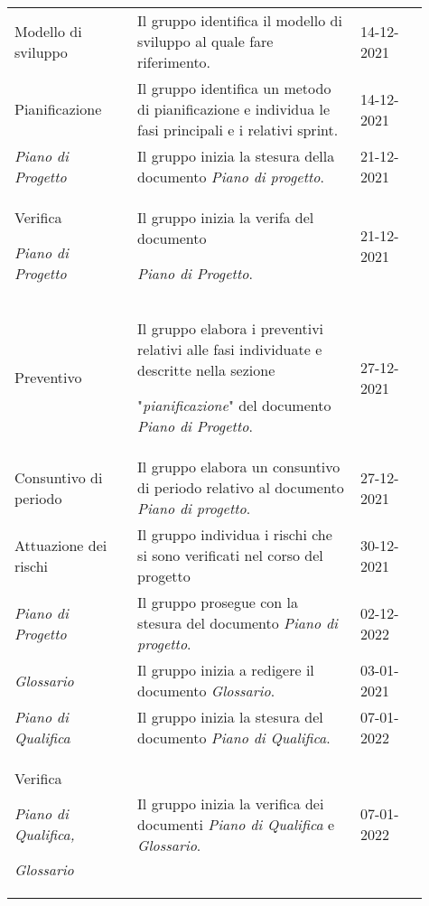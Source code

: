 {\begin{longtable}{p{0.27\linewidth}p{0.49\linewidth}p{0.15\linewidth}}
    \rowcolor[RGB]{216, 235, 171}
    Modello di sviluppo & Il gruppo identifica il modello di sviluppo al quale fare riferimento. & 14-12-2021\\

    \rowcolor[RGB]{233, 245, 206}
    Pianificazione & Il gruppo identifica un metodo di pianificazione e individua le fasi principali e i relativi sprint. & 14-12-2021\\

    \rowcolor[RGB]{216, 235, 171}
    \textit{Piano di Progetto} & Il gruppo inizia la stesura della documento \textit{Piano di progetto}. & 21-12-2021\\

    \rowcolor[RGB]{233, 245, 206}
    Verifica \par \textit{Piano di Progetto} & Il gruppo inizia la verifa del documento \par \textit{Piano di Progetto}. & 21-12-2021\\

    \rowcolor[RGB]{216, 235, 171}
    Preventivo & Il gruppo elabora i preventivi relativi alle fasi individuate e descritte nella sezione \par "\textit{pianificazione}" del documento \textit{Piano di Progetto}. & 27-12-2021\\

    \rowcolor[RGB]{233, 245, 206}
    Consuntivo di periodo & Il gruppo elabora un consuntivo di periodo relativo al documento \textit{Piano di progetto}. & 27-12-2021\\

    \rowcolor[RGB]{216, 235, 171}
    Attuazione dei rischi & Il gruppo individua i rischi che si sono verificati nel corso del progetto & 30-12-2021\\

    \rowcolor[RGB]{233, 245, 206}
    \textit{Piano di Progetto} & Il gruppo prosegue con la stesura del documento \textit{Piano di progetto}. & 02-12-2022\\
    
    \rowcolor[RGB]{216, 235, 171}
    \textit{Glossario} & Il gruppo inizia a redigere il documento \textit{Glossario}. & 03-01-2021\\

    \rowcolor[RGB]{233, 245, 206}
    \textit{Piano di Qualifica} & Il gruppo inizia la stesura del documento \textit{Piano di Qualifica}. & 07-01-2022\\

    \rowcolor[RGB]{216, 235, 171}
    Verifica \par \textit{Piano di Qualifica,} \par \textit{Glossario} & Il gruppo inizia la verifica dei documenti \textit{Piano di Qualifica} e \textit{Glossario}. & 07-01-2022\\


\end{longtable}}
